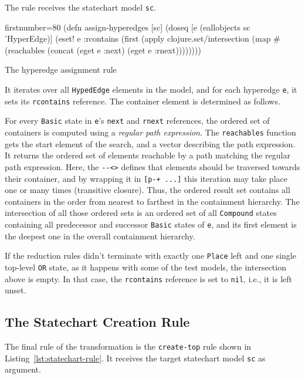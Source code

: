 \documentclass[11pt]{article}
\begin{document}
The rule receives the statechart model \verb|sc|.

\begin{listing}[H]
  \begin{clojurecode*}{firstnumber=80}
(defn assign-hyperedges [sc]
  (doseq [e (eallobjects sc 'HyperEdge)]
    (eset! e :rcontains
           (first (apply clojure.set/intersection
                         (map #(reachables %
                              (concat (eget e :next) (eget e :rnext))))))))
  \end{clojurecode*}
  \label{lst:hyperedge-rule}
  \caption{The hyperedge assignment rule}
\end{listing}

It iterates over all \verb|HypedEdge| elements in the model, and for each
hyperedge \verb|e|, it sets its \verb|rcontains| reference.  The container
element is determined as follows.

For every \verb|Basic| state in \verb|e|'s \verb|next| and \verb|rnext|
references, the ordered set of containers is computed using a \emph{regular
  path expression}.  The \verb|reachables| function gets the start element of
the search, and a vector describing the path expression.  It returns the
ordered set of elements reachable by a path matching the regular path
expression.  Here, the \verb|--<>| defines that elements should be traversed
towards their container, and by wrapping it in \verb|[p-+ ...]| this iteration
may take place one or many times (transitive closure).  Thus, the ordered
result set contains all containers in the order from nearest to farthest in the
containment hierarchy.  The intersection of all those ordered sets is an
ordered set of all \verb|Compound| states containing all predecessor and
successor \verb|Basic| states of \verb|e|, and its first element is the deepest
one in the overall containment hierarchy.

If the reduction rules didn't terminate with exactly one \verb|Place| left and
one single top-level \verb|OR| state, as it happens with some of the test
models, the intersection above is empty.  In that case, the \verb|rcontains|
reference is set to \verb|nil|, i.e., it is left unset.

\subsection{The Statechart Creation Rule}
\label{sec:statechart-rule}

The final rule of the transformation is the \verb|create-top| rule shown in
Listing~\ref{lst:statechart-rule}.  It receives the target statechart model
\verb|sc| as argument.
\end{document}
